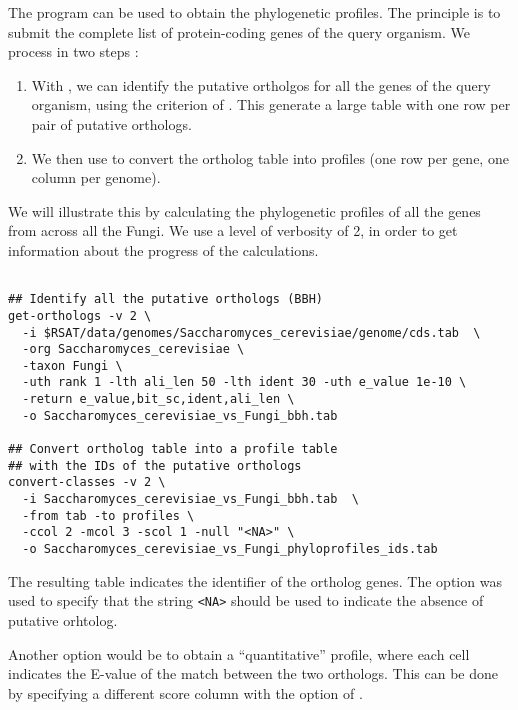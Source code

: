 The program  can be used to obtain the
phylogenetic profiles. The principle is to submit the complete list of
protein-coding genes of the query organism. We process in two steps : 

\begin{enumerate}

\item With , we can identify the putative
  ortholgos for all the genes of the query organism, using the
  criterion of . This generate a
  large table with one row per pair of putative orthologs.

\item We then use  to convert the ortholog
  table into profiles (one row per gene, one column per genome).

\end{enumerate}

We will illustrate this by calculating the phylogenetic profiles of
all the genes from  across all the
Fungi. We use a level of verbosity of 2, in order to get information
about the progress of the calculations.

\begin{footnotesize}
\begin{verbatim}

## Identify all the putative orthologs (BBH)
get-orthologs -v 2 \
  -i $RSAT/data/genomes/Saccharomyces_cerevisiae/genome/cds.tab  \
  -org Saccharomyces_cerevisiae \
  -taxon Fungi \
  -uth rank 1 -lth ali_len 50 -lth ident 30 -uth e_value 1e-10 \
  -return e_value,bit_sc,ident,ali_len \
  -o Saccharomyces_cerevisiae_vs_Fungi_bbh.tab

## Convert ortholog table into a profile table
## with the IDs of the putative orthologs
convert-classes -v 2 \
  -i Saccharomyces_cerevisiae_vs_Fungi_bbh.tab  \
  -from tab -to profiles \
  -ccol 2 -mcol 3 -scol 1 -null "<NA>" \
  -o Saccharomyces_cerevisiae_vs_Fungi_phyloprofiles_ids.tab

\end{verbatim}
\end{footnotesize}


The resulting table indicates the identifier of the ortholog
genes. The option \option{-null} was used to specify that the string
\texttt{<NA>} should be used to indicate the absence of putative
orhtolog.

Another option would be to obtain a ``quantitative'' profile, where
each cell indicates the E-value of the match between the two
orthologs. This can be done by specifying a different score column
with the option  of .

